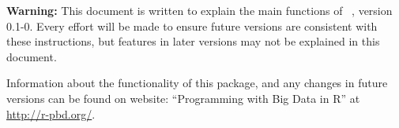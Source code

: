 {\color{red} \bf Warning:} This document is written to explain the main
functions of ~\citep{Schmidt2012pbdDEMOpackage}, version 0.1-0.
Every effort will be made to ensure future versions are consistent with
these instructions, but features in later versions may not be explained
in this document.

Information about the functionality of this package,
and any changes in future versions can be found on website:
``Programming with Big Data in R'' at
\url{http://r-pbd.org/}.

